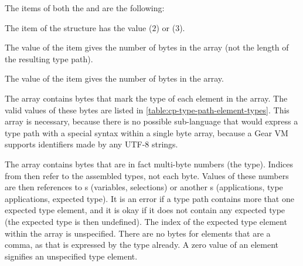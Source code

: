 The items of both the  and  are the following:
\begin{description}[font=\ttfamily\mdseries,style=nextline]
  \item[tag]
  The  item of the structure has the value  ($2$) or  ($3$). 
  \item[length]
  The value of the  item gives the number of bytes in the  array (not the length of the resulting type path).
  \item[element\_count]
  The value of the  item gives the number of bytes in the  array.
  \item[element\_types]
  The  array contains bytes that mark the type of each element in the  array. The valid values of these bytes are listed in \autoref{table:cp-type-path-element-types}. This array is necessary, because there is no possible sub-language that would express a type path with a special syntax within a single byte array, because a Gear VM supports identifiers made by any \mbox{UTF-8} strings. 
  \item[elements]
  The  array contains bytes that are in fact multi-byte numbers (the  type). Indices from  then refer to the assembled  types, not each byte. Values of these numbers are then references to s (variables, selections) or another s (applications, type applications, expected type). It is an error if a type path contains more that one expected type element, and it is okay if it does not contain any expected type (the expected type is then undefined). The index of the expected type element within the  array is unspecified. There are no bytes for elements that are a comma, as that is expressed by the type already. A zero value of an element signifies an unspecified type element. 
\end{description}


